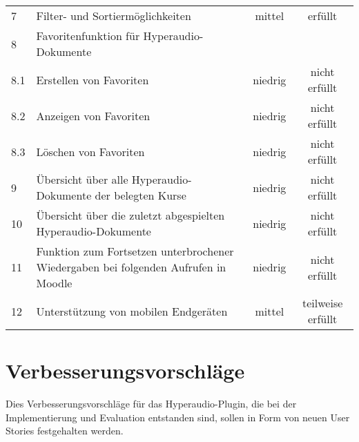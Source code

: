 \begin{table}[!ht]
\begin{tabularx}{\textwidth}{lXcc}
   	7 & Filter- und Sortiermöglichkeiten & mittel & erfüllt\\
    8 & Favoritenfunktion für Hyperaudio-Dokumente & & \\
    8.1 & \hspace*{0.5cm} Erstellen von Favoriten & niedrig & nicht erfüllt\\
    8.2 & \hspace*{0.5cm} Anzeigen von Favoriten & niedrig & nicht erfüllt\\
    8.3 & \hspace*{0.5cm} Löschen von Favoriten & niedrig & nicht erfüllt\\    
    9 & Übersicht über alle Hyperaudio-Dokumente der belegten Kurse & niedrig & nicht erfüllt\\
    10 & Übersicht über die zuletzt abgespielten Hyperaudio-Dokumente & niedrig & nicht erfüllt\\
    11 &  Funktion zum Fortsetzen unterbrochener Wiedergaben bei folgenden Aufrufen in Moodle & niedrig & nicht erfüllt\\
    12 & Unterstützung von mobilen Endgeräten & mittel & teilweise erfüllt\\
    \hline
\end{tabularx}
\end{table}

\section{Verbesserungsvorschläge}
Dies Verbesserungsvorschläge für das Hyperaudio-Plugin, die bei der Implementierung und Evaluation entstanden sind,  sollen in Form von neuen User Stories festgehalten werden.





